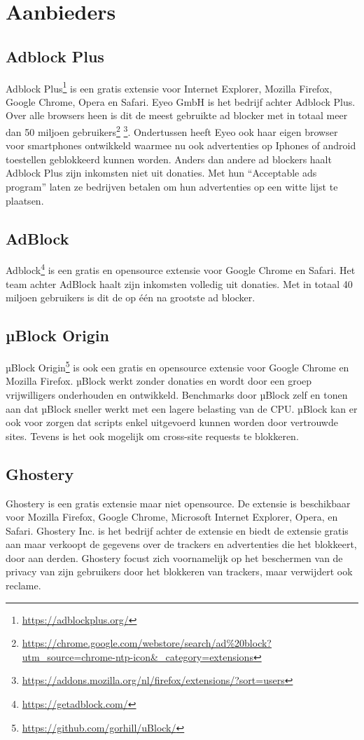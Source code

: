 \documentclass[pdftex,a4paper,12pt,twoside]{report}
\begin{document}
\section{Aanbieders}
\label{sec:Aanbieders}
\subsection{Adblock Plus}
\label{sec:Adblock Plus}
Adblock Plus\footnote{\url{https://adblockplus.org/}} is een gratis extensie voor Internet Explorer, Mozilla Firefox, Google Chrome, Opera en Safari. Eyeo GmbH is het bedrijf achter Adblock Plus. Over alle browsers heen is dit de meest gebruikte ad blocker met in totaal meer dan 50 miljoen gebruikers\footnote{\url{https://chrome.google.com/webstore/search/ad\%20block?utm_source=chrome-ntp-icon&_category=extensions}} \footnote{\url{https://addons.mozilla.org/nl/firefox/extensions/?sort=users}}. Ondertussen heeft Eyeo ook haar eigen browser voor smartphones ontwikkeld waarmee nu ook advertenties op Iphones of android toestellen geblokkeerd kunnen worden. Anders dan andere ad blockers haalt Adblock Plus zijn inkomsten niet uit donaties. Met hun "`Acceptable ads program"' laten ze bedrijven betalen om hun advertenties op een witte lijst te plaatsen.
\subsection{AdBlock}
\label{sec:AdBlock}
Adblock\footnote{\url{https://getadblock.com/}} is een gratis en opensource extensie voor Google Chrome en Safari. Het team achter AdBlock haalt zijn inkomsten volledig uit donaties. Met in totaal 40 miljoen gebruikers is dit de op één na grootste ad blocker.

\subsection{µBlock Origin}
\label{sec:uBlock Origin}
µBlock Origin\footnote{\url{https://github.com/gorhill/uBlock/}} is ook een gratis en opensource extensie voor Google Chrome en Mozilla Firefox. µBlock werkt zonder donaties en wordt door een groep vrijwilligers onderhouden en ontwikkeld. Benchmarks door µBlock zelf en \citep{PerformanceAB} tonen aan dat µBlock sneller werkt met een lagere belasting van de CPU. µBlock kan er ook voor zorgen dat scripts enkel uitgevoerd kunnen worden door vertrouwde sites. Tevens is het ook mogelijk om cross-site requests te blokkeren.

\subsection{Ghostery}
\label{sec:Ghostery}
Ghostery is een gratis extensie maar niet opensource. De extensie is beschikbaar voor  Mozilla Firefox, Google Chrome, Microsoft Internet Explorer, Opera, en Safari. Ghostery Inc. is het bedrijf achter de extensie en biedt de extensie gratis aan maar verkoopt de gegevens over de trackers en advertenties die het blokkeert, door aan derden. Ghostery focust zich voornamelijk op het beschermen van de privacy van zijn gebruikers door het blokkeren van trackers, maar verwijdert ook reclame.
\end{document}
